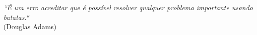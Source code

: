 \begin{epigrafe}
	\begin{flushright}
		\vspace*{\fill}
		\textit{``É um erro acreditar que é possível resolver qualquer problema importante usando batatas.``}\\
		(Douglas Adams)
		\par
	\end{flushright}
\end{epigrafe}